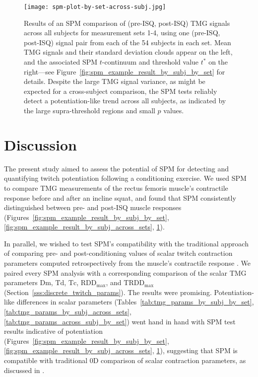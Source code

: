 \documentclass[utf8]{FrontiersinHarvard}
\newcommand{\Dm}{\ensuremath{\text{Dm}}\xspace}
\newcommand{\Td}{\ensuremath{\text{Td}}\xspace}
\newcommand{\Tc}{\ensuremath{\text{Tc}}\xspace}
\newcommand{\RDDMax}{\ensuremath{ \text{RDD}_{\text{max}}}\xspace}
\newcommand{\RDDMaxTime}{\ensuremath{ \text{TRDD}_{\text{max}}}\xspace}
\begin{document}
\begin{figure}
	\centering
    \texttt{[image: spm-plot-by-set-across-subj.jpg]}
    \caption{Results of an SPM comparison of (pre-ISQ, post-ISQ) TMG signals across all subjects for measurement sets 1-4, using one (pre-ISQ, post-ISQ) signal pair from each of the 54 subjects in each set.
    Mean TMG signals and their standard deviation clouds appear on the left, and the associated SPM $ t $-continuum and threshold value $ t^{*} $ on the right---see Figure~\ref{fig:spm_example_result_by_subj_by_set} for details.
    Despite the large TMG signal variance, as might be expected for a cross-subject comparison, the SPM tests reliably detect a potentiation-like trend across all subjects, as indicated by the large supra-threshold regions and small $ p $ values.}

    \label{fig:spm_example_across_subj_by_set}
\end{figure}

\section{Discussion}
The present study aimed to assess the potential of SPM for detecting and quantifying twitch potentiation following a conditioning exercise.
We used SPM to compare TMG measurements of the rectus femoris muscle's contractile response before and after an incline squat, and found that SPM consistently distinguished between pre- and post-ISQ muscle responses (Figures~\ref{fig:spm_example_result_by_subj_by_set}, \ref{fig:spm_example_result_by_subj_across_sets}, \ref{fig:spm_example_across_subj_by_set}).

In parallel, we wished to test SPM's compatibility with the traditional approach of comparing pre- and post-conditioning values of scalar twitch contraction parameters computed retrospectively from the muscle's contractile response \citep{cochrane, kuu, wallace, rodriguez-falces}.
We paired every SPM analysis with a corresponding comparison of the scalar TMG parameters \Dm, \Td, \Tc, \RDDMax, and \RDDMaxTime (Section~\ref{sss:discrete_twitch_params}).
The results were promising.
Potentiation-like differences in scalar parameters (Tables~\ref{tab:tmg_params_by_subj_by_set}, \ref{tab:tmg_params_by_subj_across_sets}, \ref{tab:tmg_params_across_subj_by_set}) went hand in hand with SPM test results indicative of potentiation (Figures~\ref{fig:spm_example_result_by_subj_by_set}, \ref{fig:spm_example_result_by_subj_across_sets}, \ref{fig:spm_example_across_subj_by_set}), suggesting that SPM is compatible with traditional 0D comparison of scalar contraction parameters, as discussed in \cite{pataky-roi}.
\end{document}
